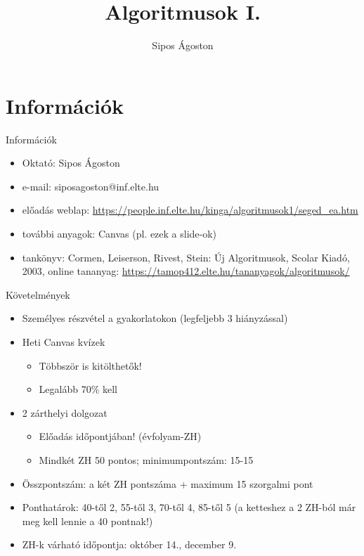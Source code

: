 \documentclass[hungarian]{beamer}
\title{Algoritmusok I.}
\author{Sipos Ágoston}
\begin{document}
\maketitle

\section{Információk}
\begin{frame}{Információk}

\begin{itemize}
    \item Oktató: Sipos Ágoston
    \item e-mail: siposagoston@inf.elte.hu
    \item előadás weblap: \href{https://people.inf.elte.hu/kinga/algoritmusok1/seged_ea.htm}{https://people.inf.elte.hu/kinga/algoritmusok1/seged\_ea.htm}
    \item további anyagok: Canvas (pl. ezek a slide-ok)
    \item tankönyv: Cormen, Leiserson, Rivest, Stein: Új Algoritmusok, Scolar Kiadó, 2003, online tananyag: \href{https://tamop412.elte.hu/tananyagok/algoritmusok/}{https://tamop412.elte.hu/tananyagok/algoritmusok/}
\end{itemize}

\end{frame}

\begin{frame}{Követelmények}
\begin{itemize}
    \item Személyes részvétel a gyakorlatokon (legfeljebb 3 hiányzással)
    \item Heti Canvas kvízek
    \begin{itemize}
        \item Többször is kitölthetők!
        \item Legalább 70\% kell
    \end{itemize}
    \item 2 zárthelyi dolgozat
    \begin{itemize}
        \item Előadás időpontjában! (évfolyam-ZH)
        \item Mindkét ZH 50 pontos; minimumpontszám: 15-15
    \end{itemize}
    \item Összpontszám: a két ZH pontszáma + maximum 15 szorgalmi pont
    \item Ponthatárok: 40-től 2, 55-től 3, 70-től 4, 85-től 5 (a ketteshez a 2 ZH-ból már meg kell lennie a 40 pontnak!)
    \item ZH-k várható időpontja: október 14., december 9.
\end{itemize}
\end{frame}
\end{document}
